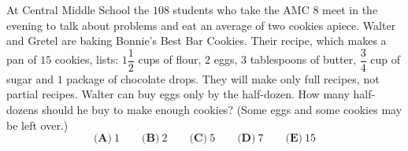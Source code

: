 At Central Middle School the $108$ students who take the AMC 8 meet in the evening to talk about problems and eat an average of two cookies apiece. Walter and Gretel are baking Bonnie's Best Bar Cookies. Their recipe, which makes a pan of $15$ cookies, lists: $1\dfrac{1}{2}$ cups of flour, $2$ eggs, $3$ tablespoons of butter, $\dfrac{3}{4}$ cup of sugar and $1$ package of chocolate drops. They will make only full recipes, not partial recipes. Walter can buy eggs only by the half-dozen. How many half-dozens should he buy to make enough cookies? (Some eggs and some cookies may be left over.)
\[
\textbf{(A)}\ 1\qquad\textbf{(B)}\ 2\qquad\textbf{(C)}\ 5\qquad\textbf{(D)}\ 7\qquad\textbf{(E)}\ 15
\]
